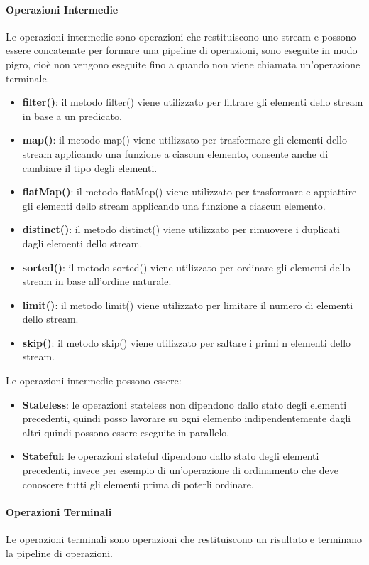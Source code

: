 \documentclass[11pt]{article}
\begin{document}
\paragraph{Operazioni Intermedie}
Le operazioni intermedie sono operazioni che restituiscono uno stream e possono essere concatenate per formare una pipeline di operazioni, sono eseguite in modo pigro, cioè non vengono eseguite fino a quando non viene chiamata un'operazione terminale.
\begin{itemize}
    \item \textbf{filter()}: il metodo filter() viene utilizzato per filtrare gli elementi dello stream in base a un predicato.
    \item \textbf{map()}: il metodo map() viene utilizzato per trasformare gli elementi dello stream applicando una funzione a ciascun elemento, consente anche di cambiare il tipo degli elementi.
    \item \textbf{flatMap()}: il metodo flatMap() viene utilizzato per trasformare e appiattire gli elementi dello stream applicando una funzione a ciascun elemento.
    \item \textbf{distinct()}: il metodo distinct() viene utilizzato per rimuovere i duplicati dagli elementi dello stream.
    \item \textbf{sorted()}: il metodo sorted() viene utilizzato per ordinare gli elementi dello stream in base all'ordine naturale.
    \item \textbf{limit()}: il metodo limit() viene utilizzato per limitare il numero di elementi dello stream.
    \item \textbf{skip()}: il metodo skip() viene utilizzato per saltare i primi n elementi dello stream.
    \end{itemize}
Le operazioni intermedie possono essere:
\begin{itemize}
    \item \textbf{Stateless}: le operazioni stateless non dipendono dallo stato degli elementi precedenti, quindi posso lavorare su ogni elemento indipendentemente dagli altri quindi possono essere eseguite in parallelo.
    \item \textbf{Stateful}: le operazioni stateful dipendono dallo stato degli elementi precedenti, invece per esempio di un'operazione di ordinamento che deve conoscere tutti gli elementi prima di poterli ordinare.
    \end{itemize}
\paragraph{Operazioni Terminali}
Le operazioni terminali sono operazioni che restituiscono un risultato e terminano la pipeline di operazioni.
\end{document}
